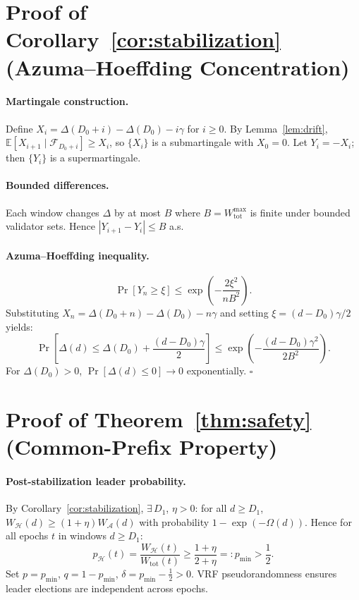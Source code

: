 \documentclass[10pt,journal,twoside]{IEEEtran}
\theoremstyle{remark}
\begin{document}
	\section{Proof of Corollary~\ref{cor:stabilization}
		(Azuma--Hoeffding Concentration)}
	\label{app:stabilization}
	
	\paragraph{Martingale construction.}
	Define $X_i = \Delta(D_0+i) - \Delta(D_0) - i\gamma$
	for $i \geq 0$.
	By Lemma~\ref{lem:drift},
	$\mathbb{E}[X_{i+1} \mid \mathcal{F}_{D_0+i}] \geq X_i$,
	so $\{X_i\}$ is a submartingale with $X_0 = 0$.
	Let $Y_i = -X_i$; then $\{Y_i\}$ is a supermartingale.
	
	\paragraph{Bounded differences.}
	Each window changes $\Delta$ by at most $B$ where
	$B = W_{\mathrm{tot}}^{\max}$ is finite under bounded
	validator sets.
	Hence $|Y_{i+1} - Y_i| \leq B$ a.s.
	
	\paragraph{Azuma--Hoeffding inequality.}
	\[
	\Pr[Y_n \geq \xi]
	\leq \exp\!\left(-\frac{2\xi^2}{nB^2}\right).
	\]
	Substituting $X_n = \Delta(D_0+n) - \Delta(D_0) - n\gamma$
	and setting $\xi = (d-D_0)\gamma/2$ yields:
	\[
	\Pr\!\left[\Delta(d) \leq \Delta(D_0)
	+ \frac{(d-D_0)\gamma}{2}\right]
	\leq \exp\!\left(-\frac{(d-D_0)\gamma^2}{2B^2}\right).
	\]
	For $\Delta(D_0) > 0$, $\Pr[\Delta(d) \leq 0] \to 0$
	exponentially.
	\hfill$\square$
	
	\section{Proof of Theorem~\ref{thm:safety}
		(Common-Prefix Property)}
	\label{app:safety}
	
	\paragraph{Post-stabilization leader probability.}
	By Corollary~\ref{cor:stabilization}, $\exists\, D_1$,
	$\eta > 0$: for all $d \geq D_1$,
	$W_{\mathcal{H}}(d) \geq (1+\eta)W_{\mathcal{A}}(d)$
	with probability $1 - \exp(-\Omega(d))$.
	Hence for all epochs $t$ in windows $d \geq D_1$:
	\[
	p_{\mathcal{H}}(t)
	= \frac{W_{\mathcal{H}}(t)}{W_{\mathrm{tot}}(t)}
	\geq \frac{1+\eta}{2+\eta}
	=: p_{\min} > \frac{1}{2}.
	\]
	Set $p = p_{\min}$, $q = 1-p_{\min}$,
	$\delta = p_{\min} - \tfrac{1}{2} > 0$.
	VRF pseudorandomness ensures leader elections are
	independent across epochs.
	
\end{document}
